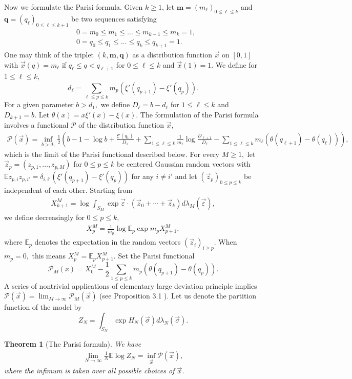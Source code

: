 \documentclass[12pt]{article}
\newcommand{\veps}{\vec{\varepsilon}}
\newcommand{\vsi}{{\vec{\sigma}}}
\newcommand{\vx}{\vec{x}}
\newcommand{\vz}{\vec{z}}
\newtheorem{theorem}{\bf Theorem}
\newenvironment{Proof of lemma}{\noindent{\bf Proof of Lemma}}{\hfill$\Box$\newline}
\newenvironment{Proof of theorem}{\noindent{\bf Proof of Theorem}}{\hfill{\footnotesize${\square}$}\newline}
\newenvironment{Proof of theorems}{\noindent{\bf Proof of Theorems}}{\hfill$\Box$\newline}
\newenvironment{Proof of proposition}{\noindent{\bf Proof of Proposition}}{\hfill$\Box$\newline}
\newenvironment{Proof of propositions}{\noindent{\bf Proof of Propositions}}{\hfill$\Box$\newline}
\newenvironment{Proof of exercise}{\noindent{\it Proof of Exercise:}}{\hfill$\Box$}
\numberwithin{equation}{section}
\begin{document}
Now we formulate the Parisi formula. Given $k\geq 1$, let $\mathbf{m}=(m_\ell)_{0\leq \ell\leq k}$ and $\mathbf{q}=(q_\ell)_{0\leq \ell\leq k+1}$ be two sequences satisfying
\begin{align*}
&0=m_0\leq m_1\leq\ldots\leq m_{k-1}\leq m_k=1,\\
&0=q_0\leq q_1\leq \ldots \leq q_k\leq q_{k+1}=1.
\end{align*}
One may think of the triplet $(k,\mathbf{m},\mathbf{q})$ as a distribution function $\vx$ on $\left[0,1\right]$ with $\vx(q)=m_\ell$ if $q_\ell\leq q<q_{\ell+1}$ for $0\leq \ell\leq k$ and $\vx(1)=1.$ We define for $1\leq \ell\leq k,$
$$d_\ell=\sum_{\ell\leq p\leq k}m_p(\xi'(q_{p+1})-\xi'(q_p)).$$ 
For a given parameter $b>d_1,$ we define $D_\ell=b-d_\ell$ for $1\leq \ell\leq k$ and $D_{k+1}=b.$ Let $\theta(x)=x\xi'(x)-\xi(x).$ 
The formulation of the Parisi formula involves a functional $\mathcal{P}$ of the distribution function $\vx$,
\begin{align*}
\mathcal{P}(\vx)=\inf_{b>d_1}\frac{1}{2}\left(b-1-\log b+\frac{\xi'(q_1)}{D_1}+\sum_{1\leq \ell\leq k}\frac{1}{m_\ell}\log \frac{D_{\ell+1}}{D_\ell}-\sum_{1\leq \ell\leq k}m_\ell(\theta(q_{\ell+1})-\theta(q_{\ell}))\right),
\end{align*}
which is the limit of the Parisi functional described below. For every $M\geq 1,$ let $\vz_p=(z_{p,1},\ldots,z_{p,M})$ for $0\leq p\leq k$ be centered Gaussian random vectors with $\mathbb{E}z_{p,i}z_{p,i'}=\delta_{i,i'}(\xi'(q_{p+1})-\xi'(q_p))$ for any $i\neq i'$ and let $(\vz_p)_{0\leq p\leq k}$ be independent of each other. Starting from
\begin{align*}
X_{k+1}^M=\log\int_{S_M}\exp \veps\cdot \left(\vz _0+\cdots+\vz _k\right)d\lambda_M(\veps),
\end{align*}
we define decreasingly for $0\leq p\leq k,$
\begin{align*}
X_p^M=\frac{1}{m_p}\log\mathbb{E}_p \exp m_p X_{p+1}^M,
\end{align*}
where $\mathbb{E}_p$ denotes the expectation in the random vectors $(\vz_i)_{i\geq p}.$ When $m_p=0,$ this means $X_p^M=\mathbb{E}_p X_{p+1}^M.$ 
Set the Parisi functional $$
\mathcal{P}_M(x)=X_0^M-\frac{1}{2}\sum_{1\leq p\leq k}m_p(\theta(q_{p+1})-\theta(q_p)).
$$
A series of nontrivial applications of elementary large deviation principle implies $\mathcal{P}(\vx)=\lim_{M\rightarrow\infty}\mathcal{P}_M(\vx)$ (see Proposition 3.1 \cite{Tal061}). Let us denote the partition function of the model by $$
Z_N=\int_{S_N}\exp H_N(\vsi)d\lambda_N(\vsi).
$$
\begin{theorem}[The Parisi formula]\label{thm1} We have
\begin{align}\label{thm1:eq1}
\lim_{N\rightarrow\infty}\frac{1}{N}\mathbb{E}\log Z_N=\inf_{\vx}\mathcal{P}(\vx),
\end{align}
where the infimum is taken over all possible choices of $\vx$.
\end{theorem}
\end{document}
